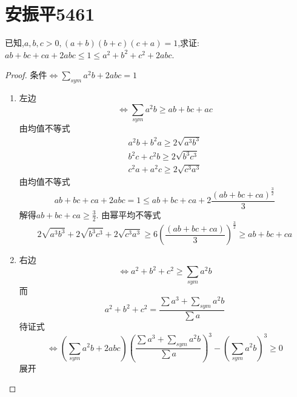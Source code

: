 \documentclass[]{article}
\title{}
\author{}
\date{}
\begin{document}
\section{安振平5461}{
已知,$a,b,c>0,(a+b)(b+c)(c+a)=1$,求证:$ab+bc+ca+2abc \leq 1\leq a^2+b^2+c^2+2abc$.

\begin{proof}
条件$\Longleftrightarrow \sum\limits_{sym}a^2b+2abc=1$
\begin{enumerate}
    \item 左边
    \begin{equation}\nonumber
        \Longleftrightarrow \sum_{sym}a^2b \geq ab+bc+ac
    \end{equation}
    由均值不等式
    \begin{equation}\nonumber
    \begin{split}\nonumber
        a^2b+b^2a\geq 2\sqrt{a^3b^3}\\
        b^2c+c^2b\geq 2\sqrt{b^3c^3}\\
        c^2a+a^2c\geq 2\sqrt{c^3a^3}
    \end{split}
    \end{equation}
    由均值不等式
    \begin{equation}\nonumber
        ab+bc+ca+2abc=1\leq ab+bc+ca+2\frac{(ab+bc+ca)^{\frac{3}{2}}}{3}
    \end{equation}
    解得$ab+bc+ca\geq \frac{3}{2}$.
    由幂平均不等式
    \begin{equation}\nonumber
        2\sqrt{a^3b^3}+2\sqrt{b^3c^3}+2\sqrt{c^3a^3}\geq 6(\frac{(ab+bc+ca)}{3})^{\frac{3}{2}}\geq ab+bc+ca
    \end{equation}
    \item 右边
    \begin{equation}\nonumber
        \Longleftrightarrow a^2+b^2+c^2\geq \sum_{sym}a^2b
    \end{equation}
    而
    \begin{equation}\nonumber
        a^2+b^2+c^2=\frac{\sum a^3+\sum\limits_{sym}a^2b}{\sum a}
    \end{equation}
    待证式
    \begin{equation}\nonumber
        \Longleftrightarrow (\sum\limits_{sym}a^2b+2abc)(\frac{\sum a^3+\sum\limits_{sym}a^2b}{\sum a})^3-(\sum\limits_{sym}a^2b)^3\geq 0 
    \end{equation}
    展开
    \begin{equation}\nonumber

\end{equation}
\end{enumerate}
\end{proof}}
\end{document}
